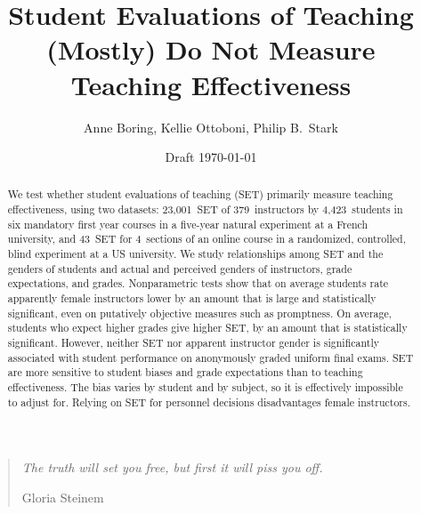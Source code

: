 \documentclass[12pt]{article}
\title{Student Evaluations of Teaching (Mostly) Do Not Measure Teaching Effectiveness}
\author{Anne Boring, Kellie Ottoboni, Philip B.~Stark}
\date{Draft \today}
\begin{document}
\maketitle

\newpage
\begin{quotation}
    \emph{The truth will set you free, but first it will piss you off.}
    
     \hfill Gloria Steinem

\begin{abstract}

We test whether student evaluations of teaching (SET) 
primarily measure teaching effectiveness, using 
two datasets:
23,001~SET of 379~instructors by 4,423~students in six 
mandatory first year courses in a five-year natural experiment at a French university, 
and
43~SET for 4~sections of an online course in a randomized, controlled, 
blind experiment at a US university.
We study relationships among SET and the genders of students and actual and
perceived genders of instructors, grade expectations, and grades.
Nonparametric tests show that on average students rate apparently female instructors lower 
by an amount that is 
large and statistically significant, even on putatively objective measures such as promptness.
On average, students who expect higher grades give higher SET, 
by an amount that is statistically significant.
However, neither SET nor apparent instructor gender is significantly associated 
with student performance on anonymously graded uniform final exams. 
SET are more sensitive to student biases and grade expectations than to teaching 
effectiveness.
The bias varies by student and by subject, so it is effectively impossible to adjust for. 
Relying on SET for personnel decisions disadvantages female instructors.




\end{abstract}
\end{quotation}
\end{document}
